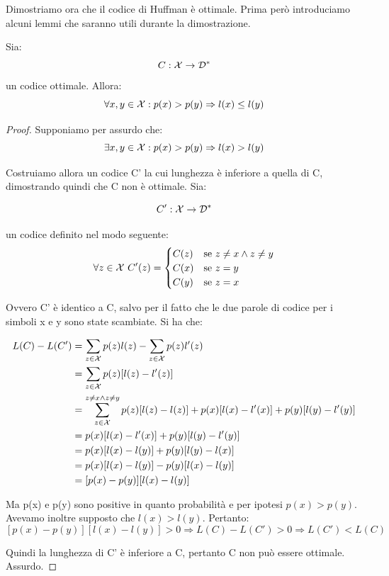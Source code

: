 Dimostriamo ora che il codice di Huffman è ottimale. Prima però introduciamo alcuni lemmi che saranno utili durante la dimostrazione.
\begin{proposizione}
\mbox{}

 Sia:
 \[
  C: \mathcal{X} \to \mathcal{D}^*
 \]
  un codice ottimale. Allora:
\[
 \forall x,y \in \mathcal{X}: p(x)>p(y) \Rightarrow l(x) \le l(y)
\]
\begin{proof}
\mbox{}

 Supponiamo per assurdo che:
\[
 \exists x,y \in \mathcal{X}: p(x)>p(y) \Rightarrow l(x) > l(y)
\]

 \noindent
 Costruiamo allora un codice C' la cui lunghezza è inferiore a quella di C, dimostrando quindi che C 
 non è ottimale. Sia:

 \[
  C': \mathcal{X} \to \mathcal{D}^*
 \]

 un codice definito nel modo seguente:
 \[
  \forall z \in \mathcal{X} \
  C'(z)=
   \begin{cases} 
     C(z) & \mbox{se } z \ne x \land z \ne y  \\ 
     C(x) & \mbox{se } z=y \\
     C(y) & \mbox{se } z=x
   \end{cases} 
 \]

\noindent
Ovvero C' è identico a C, salvo per il fatto che le due parole di codice per i simboli x e y sono state scambiate.
Si ha che:

\[ \begin{split}
 L(C)-L(C') &=\sum_{z \in \mathcal{X}} p(z) l(z) - \sum_{z \in \mathcal{X}} p(z) l'(z) \\
            &=\sum_{z \in \mathcal{X}} p(z)[l(z)-l'(z)] \\
            &=\sum_{z \in \mathcal{X}}^{
                    z \ne x \land z\ne y} p(z)[l(z)-l(z)] + p(x)[l(x)-l'(x)] + p(y)[l(y)-l'(y)] \\
            &=p(x)[l(x)-l'(x)] + p(y)[l(y)-l'(y)] \\
            &=p(x)[l(x)-l(y)] + p(y)[l(y)-l(x)] \\
            &=p(x)[l(x)-l(y)] - p(y)[l(x)-l(y)] \\
            &=[p(x)-p(y)][l(x)-l(y)]
   \end{split}
\]

\noindent
Ma p(x) e p(y) sono positive in quanto probabilità e per ipotesi $p(x) > p(y)$. Avevamo inoltre supposto che $l(x) > l(y)$. Pertanto:
\[
 [p(x)-p(y)][l(x)-l(y)] > 0 \Rightarrow L(C)-L(C')>0 \Rightarrow L(C')<L(C)
\]

\noindent
Quindi la lunghezza di C' è inferiore a C, pertanto C non può essere ottimale. Assurdo.

\end{proof}

\end{proposizione}


